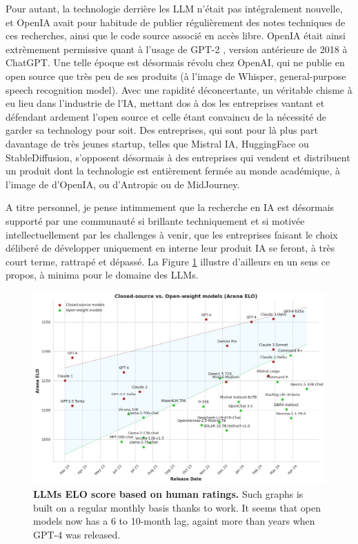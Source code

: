 Pour autant, la technologie derrière les LLM n'était pas intégralement nouvelle, et OpenIA avait pour habitude de publier régulièrement des notes techniques de ces recherches, ainsi que le code source associé en accès libre. OpenIA était ainsi extrèmement permissive quant à l'usage de GPT-2 \citep{radford2019language}, version antérieure de 2018 à ChatGPT. Une telle époque est désormais révolu chez OpenAI, qui ne publie en open source que très peu de ses produits (à l'image de Whisper, general-purpose speech recognition model). Avec une rapidité déconcertante, un véritable chisme à eu lieu dans l'industrie de l'IA, mettant dos à dos les entreprises vantant et défendant ardement l'open source et celle étant convaincu de la nécessité de garder sa technology pour soit. Des entreprises, qui sont pour là plus part davantage de très jeunes startup,  telles que Mistral IA, HuggingFace ou StableDiffusion,  s'opposent désormais à des entreprises qui vendent et distribuent un produit dont la technologie est entièrement fermée au monde académique, à l'image de d'OpenIA, ou d'Antropic ou de MidJourney. 

A titre personnel, je pense intimmement que la recherche en IA est désormais supporté par une communauté si brillante techniquement et si motivée intellectuellement par les challenges à venir, que les entreprises faisant le choix déliberé de développer uniquement en interne leur produit IA se feront, à très court terme, rattrapé et dépassé. La Figure \ref{fig:conclusion-openclose} illustre d'ailleurs en un sens ce propos, à minima pour le domaine des LLMs. 
 
\begin{figure}[htb!]
    \center
  \includegraphics[width=\linewidth]{images/conclusion/open-close.jpeg}
  \caption{\textbf{LLMs ELO score based on human ratings.} Such graphs is built on a regular monthly basis thanks to \citep{chiang2024chatbot} work. It seems that open models now has a 6 to 10-month lag, againt more than years when GPT-4 was released.}
  \label{fig:conclusion-openclose}
\end{figure}

